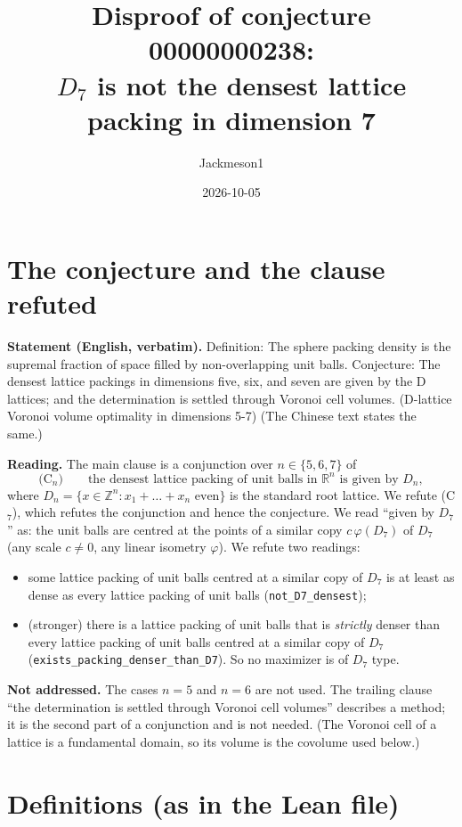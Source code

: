 \documentclass[11pt]{article}
\title{Disproof of conjecture 00000000238:\\ $D_7$ is not the densest lattice packing in dimension 7}
\author{Jackmeson1}
\date{2026-10-05}
\theoremstyle{definition}
\theoremstyle{remark}
\newcommand{\R}{\mathbb{R}}
\newcommand{\Z}{\mathbb{Z}}
\begin{document}
\maketitle

\section{The conjecture and the clause refuted}

\textbf{Statement (English, verbatim).} Definition: The sphere packing density is the supremal
fraction of space filled by non-overlapping unit balls. Conjecture: The densest lattice packings in
dimensions five, six, and seven are given by the D lattices; and the determination is settled
through Voronoi cell volumes. (D-lattice Voronoi volume optimality in dimensions 5-7)
(The Chinese text states the same.)

\textbf{Reading.} The main clause is a conjunction over $n\in\{5,6,7\}$ of
\[
  \text{(C$_n$)}\qquad \text{the densest lattice packing of unit balls in } \R^n \text{ is given by } D_n ,
\]
where $D_n=\{x\in\Z^n : x_1+\dots+x_n \text{ even}\}$ is the standard root lattice. We refute
(C$_7$), which refutes the conjunction and hence the conjecture. We read ``given by $D_7$'' as:
the unit balls are centred at the points of a similar copy $c\,\varphi(D_7)$ of $D_7$ (any scale
$c\neq 0$, any linear isometry $\varphi$). We refute two readings:
\begin{itemize}
\item[(R1)] some lattice packing of unit balls centred at a similar copy of $D_7$ is at least as
  dense as every lattice packing of unit balls (\texttt{not\_D7\_densest});
\item[(R2)] (stronger) there is a lattice packing of unit balls that is \emph{strictly} denser than
  every lattice packing of unit balls centred at a similar copy of $D_7$
  (\texttt{exists\_packing\_denser\_than\_D7}). So no maximizer is of $D_7$ type.
\end{itemize}
\textbf{Not addressed.} The cases $n=5$ and $n=6$ are not used. The trailing clause ``the
determination is settled through Voronoi cell volumes'' describes a method; it is the second part
of a conjunction and is not needed. (The Voronoi cell of a lattice is a fundamental domain, so its
volume is the covolume used below.)

\section{Definitions (as in the Lean file)}
\end{document}
